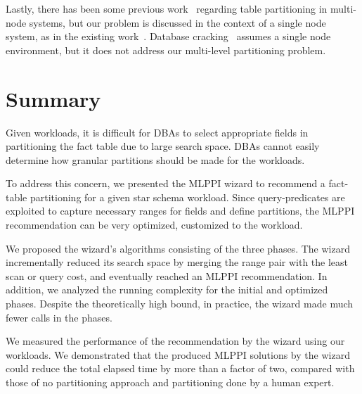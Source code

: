 \documentclass[runningheads]{comsis2}
\begin{document}
Lastly, there has been some previous work~\cite{nehme2011automated,rao2002automating,tatarowicz2012lookup} 
regarding table partitioning in multi-node \hbox{systems}, but 
our problem is discussed in the context of a single node system, as in the existing work~\cite{agrawal04:integrating}. 
Database cracking~\cite{idreoskm07}
assumes a single node environment, but 
it does not address our multi-level partitioning problem. 

\section{Summary}
\label{sec:conclusion}

Given workloads, it is difficult for DBAs to select appropriate fields 
in partitioning the fact table due to large search space. 
DBAs cannot easily determine how granular partitions should be made 
for the workloads. 

To address this concern, we presented the MLPPI wizard to recommend a fact-table partitioning for a given star schema workload. 
Since \hbox{query-predicates} are exploited 
to capture necessary ranges for fields and define partitions, 
the MLPPI \hbox{recommendation} can be very optimized, customized to the workload.  

We proposed the wizard's algorithms consisting of the three phases. 
The wizard incrementally reduced its search space by merging 
the range pair with the least scan or query cost, and eventually reached an MLPPI recommendation. 
In addition, we analyzed the running complexity for the initial and optimized phases. 
Despite the theoretically high bound, in practice, the wizard made much fewer calls in the phases.

We measured the performance of the recommendation by the wizard using 
our workloads.  
We demonstrated that the produced MLPPI solutions by 
the wizard could reduce the total elapsed time by more than a factor of two, 
compared with those of no partitioning approach and partitioning 
done by a human expert. 


{\footnotesize


}
\end{document}
